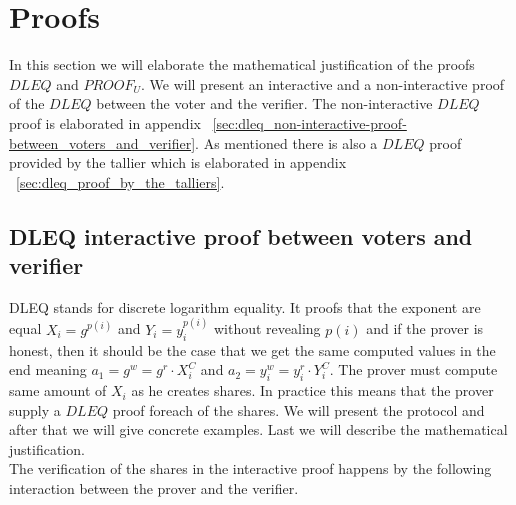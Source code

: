 \section{Proofs} \label{sec:proofs}
In this section we will elaborate the mathematical justification of the proofs $DLEQ$ and $PROOF_U$. We will present an interactive and a non-interactive proof of the $DLEQ$ between the voter and the verifier. The non-interactive $DLEQ$ proof is elaborated in appendix ~\ref{sec:dleq_non-interactive-proof-between_voters_and_verifier}. As mentioned there is also a $DLEQ$ proof provided by the tallier which is elaborated in appendix ~\ref{sec:dleq_proof_by_the_talliers}.

\subsection{DLEQ interactive proof between voters and verifier} \label{sec:dleq_voter_verifier}
DLEQ stands for discrete logarithm equality. It proofs that the exponent are equal $X_i=g^{p(i)}$ and  $Y_i=y_i^{p(i)}$ without revealing \begin{math}{p(i)} \end{math} and if the prover is honest, then it should be the case that we get the same computed values in the end meaning $a_1 = g^w= g^r \cdot X_i^C$ and $a_2= y_i^w = y_i^r \cdot Y_i^C$. The prover must compute same amount of $X_i$ as he creates shares. In practice this means that the prover supply a $DLEQ$ proof foreach of the shares. We will present the protocol and after that we will give concrete examples. Last we will describe the mathematical justification.\\

\noindent
The verification of the shares in the interactive proof happens by the following  interaction between the prover and the verifier.


